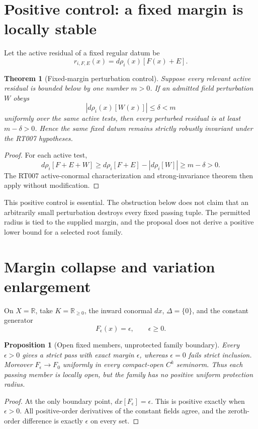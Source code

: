 \documentclass[11pt]{article}
\newtheorem{theorem}{Theorem}
\newtheorem{proposition}{Proposition}
\newcommand{\R}{\mathbb R}
\begin{document}
\section{Positive control: a fixed margin is locally stable}

Let the active residual of a fixed regular datum be
\[
 r_{i,F,E}(x)=d\rho_i(x)[F(x)+E].
\]

\begin{theorem}[Fixed-margin perturbation control]
Suppose every relevant active residual is bounded below by one number
\(m>0\).  If an admitted field perturbation \(W\) obeys
\[
 \left|d\rho_i(x)[W(x)]\right|\leq\delta<m
\]
uniformly over the same active tests, then every perturbed residual is at
least \(m-\delta>0\).  Hence the same fixed datum remains strictly robustly
invariant under the RT007 hypotheses.
\end{theorem}

\begin{proof}
For each active test,
\[
 d\rho_i[F+E+W]
 \geq d\rho_i[F+E]-|d\rho_i[W]|
 \geq m-\delta>0.
\]
The RT007 active-conormal characterization and strong-invariance theorem then
apply without modification.
\end{proof}

This positive control is essential.  The obstruction below does not claim
that an arbitrarily small perturbation destroys every fixed passing tuple.
The permitted radius is tied to the supplied margin, and the proposal does
not derive a positive lower bound for a selected root family.

\section{Margin collapse and variation enlargement}

On \(X=\R\), take \(K=\R_{\geq0}\), the inward conormal \(dx\),
\(\Delta=\{0\}\), and the constant generator
\[
 F_\epsilon(x)=\epsilon,
 \qquad \epsilon\geq0.
\]

\begin{proposition}[Open fixed members, unprotected family boundary]
Every \(\epsilon>0\) gives a strict pass with exact margin \(\epsilon\),
whereas \(\epsilon=0\) fails strict inclusion.  Moreover
\(F_\epsilon\to F_0\) uniformly in every compact-open \(C^k\) seminorm.
Thus each passing member is locally open, but the family has no positive
uniform protection radius.
\end{proposition}

\begin{proof}
At the only boundary point, \(dx[F_\epsilon]=\epsilon\).  This is positive
exactly when \(\epsilon>0\).  All positive-order derivatives of the constant
fields agree, and the zeroth-order difference is exactly \(\epsilon\) on
every set.
\end{proof}
\end{document}
